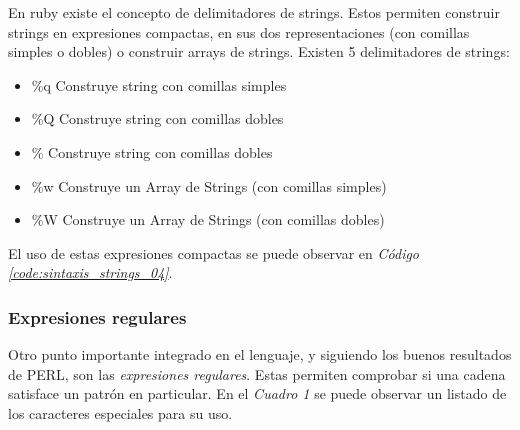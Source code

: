 \documentclass{article}
\newcommand{\refcode}[1]{\textit{Código \ref{#1}}}
\begin{document}
 
\bigskip

	En ruby existe el concepto de delimitadores de strings. Estos permiten construir strings en expresiones compactas, en sus dos representaciones (con comillas simples o dobles) o construir arrays de strings. Existen 5 delimitadores de strings:

\begin{itemize}
	\itemsep=1pt \topsep=0pt \partopsep=0pt \parskip=0pt \parsep=0pt
	\item  \%q	Construye string con comillas simples
	\item  \%Q	Construye string con comillas dobles
	\item  \%        Construye string con comillas dobles
	\item \%w	Construye un Array de Strings (con comillas simples)
	\item  \%W     Construye un Array de Strings (con comillas dobles)
\end{itemize}
	
	El uso de estas expresiones compactas se puede observar en \refcode{code:sintaxis_strings_04}.

 
\bigskip



\subsubsection{Expresiones regulares}
Otro punto importante integrado en el lenguaje, y siguiendo los buenos resultados de PERL, son las \textit{expresiones regulares}. Estas permiten comprobar si una cadena satisface un patrón en particular. En el \textit{Cuadro 1} se puede observar un listado de los caracteres especiales para su uso.\\
\end{document}
